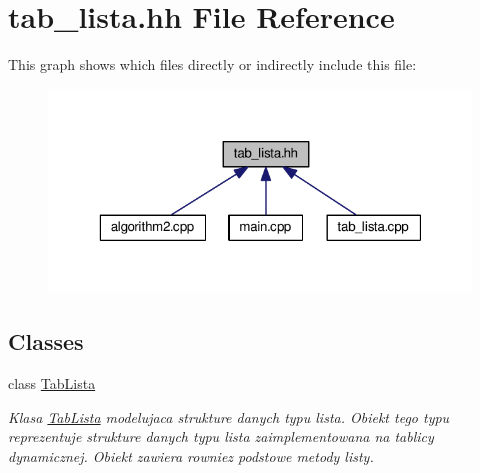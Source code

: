 \hypertarget{tab__lista_8hh}{}\section{tab\+\_\+lista.\+hh File Reference}
\label{tab__lista_8hh}
This graph shows which files directly or indirectly include this file\+:\nopagebreak
\begin{figure}[H]
\begin{center}
\leavevmode
\includegraphics[width=323pt]{tab__lista_8hh__dep__incl}
\end{center}
\end{figure}
\subsection*{Classes}
\begin{DoxyCompactItemize}
\item 
class \hyperlink{class_tab_lista}{Tab\+Lista}
\begin{DoxyCompactList}\small\item\em Klasa \hyperlink{class_tab_lista}{Tab\+Lista} modelujaca strukture danych typu lista. Obiekt tego typu reprezentuje strukture danych typu lista zaimplementowana na tablicy dynamicznej. Obiekt zawiera rowniez podstowe metody listy. \end{DoxyCompactList}\end{DoxyCompactItemize}
